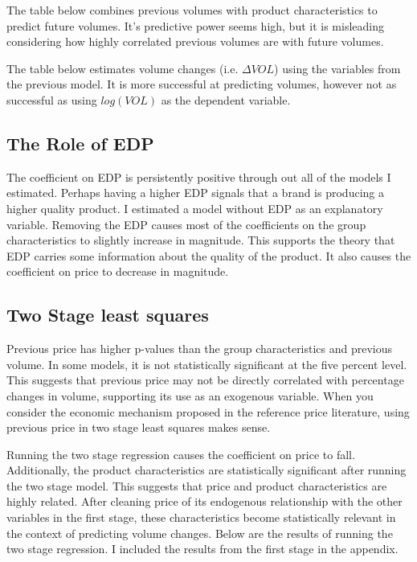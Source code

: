\documentclass{article}
\begin{document}
The table below combines previous volumes with product characteristics to predict future volumes. It's predictive power seems high, but it is misleading considering how highly correlated previous volumes are with future volumes.

The table below estimates volume changes (i.e. $\Delta VOL$) using the variables from the previous model. It is more successful at predicting volumes, however not as successful as using $log(VOL)$ as the dependent variable.

\subsection{The Role of EDP}

The coefficient on EDP is persistently positive through out all of the models I estimated. Perhaps having a higher EDP signals that a brand is producing a higher quality product. I estimated a model without EDP as an explanatory variable. Removing the EDP causes most of the coefficients on the group characteristics to slightly increase in magnitude. This supports the theory that EDP carries some information about the quality of the product. It also causes the coefficient on price to decrease in magnitude.


\subsection{Two Stage least squares}

Previous price has higher p-values than the group characteristics and previous volume. In some models, it is not statistically significant at the five percent level. This suggests that previous price may not be directly correlated with percentage changes in volume, supporting its use as an exogenous variable. When you consider the economic mechanism proposed in the reference price literature, using previous price in two stage least squares makes sense.

Running the two stage regression causes the coefficient on price to fall. Additionally, the product characteristics are statistically significant after running the two stage model. This suggests that price and product characteristics are highly related. After cleaning price of its endogenous relationship with the other variables in the first stage, these characteristics become statistically relevant in the context of predicting volume changes. Below are the results of running the two stage regression. I included the results from the first stage in the appendix.
\end{document}
